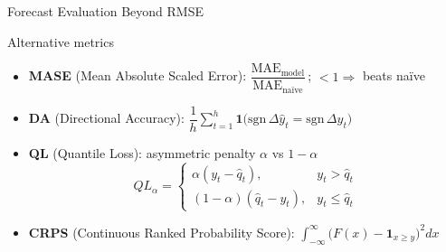 \documentclass[9pt, aspectratio=169, t]{beamer}
\begin{document}
\begin{frame}{Forecast Evaluation Beyond RMSE}
    {\small
    \begin{block}{Alternative metrics}
        \begin{itemize}\setlength{\itemsep}{4pt}
            \item \textbf{MASE} (Mean Absolute Scaled Error): $\dfrac{\text{MAE}_{\text{model}}}{\text{MAE}_{\text{naïve}}}$\,; \; $<1 \Rightarrow$ beats naïve
            \item \textbf{DA} (Directional Accuracy): $\dfrac{1}{h}\sum_{t=1}^{h} \mathbf{1}\!\bigl(\text{sgn}\,\Delta\hat{y}_t = \text{sgn}\,\Delta y_t\bigr)$
            \item \textbf{QL} (Quantile Loss): asymmetric penalty $\alpha$ vs $1\!-\!\alpha$
            \[
            QL_{\alpha} =
            \begin{cases}
            \alpha (y_t - \hat{q}_t), & y_t > \hat{q}_t \\
            (1-\alpha)(\hat{q}_t - y_t), & y_t \le \hat{q}_t
            \end{cases}
            \]
            \item \textbf{CRPS} (Continuous Ranked Probability Score): $\displaystyle\int_{-\infty}^{\infty}\!\bigl(F(x) - \mathbf{1}_{x \ge y}\bigr)^{2}dx$
        \end{itemize}
    \end{block}
    }
\end{frame}
\end{document}
